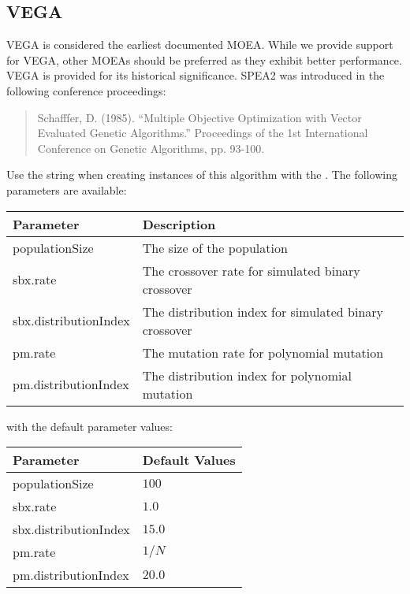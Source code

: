 \subsection{VEGA}
VEGA is considered the earliest documented MOEA.  While we provide support for VEGA, other MOEAs should be preferred as they exhibit better performance.  VEGA is provided for its historical significance. SPEA2 was introduced in the following conference proceedings:
\begin{quote}
Schafffer, D. (1985).  ``Multiple Objective Optimization with Vector Evaluated Genetic Algorithms.''  Proceedings of the 1st International Conference on Genetic Algorithms, pp. 93-100.
\end{quote}
Use the string  when creating instances of this algorithm with the .  The following parameters are available:
\newline
\newline
\begin{tabularx}{\linewidth}{lX}
  \hline
  Parameter & Description \\
  \hline
  populationSize & The size of the population \\
  sbx.rate & The crossover rate for simulated binary crossover \\
  sbx.distributionIndex & The distribution index for simulated binary crossover \\
  pm.rate & The mutation rate for polynomial mutation \\
  pm.distributionIndex & The distribution index for polynomial mutation \\
  \hline
\end{tabularx}
\newline
\newline
with the default parameter values:
\newline
\newline
\begin{tabularx}{\linewidth}{lX}
  \hline
  Parameter & Default Values \\
  \hline
  populationSize & $100$ \\
  sbx.rate & $1.0$ \\
  sbx.distributionIndex & $15.0$ \\
  pm.rate & $1/N$ \\
  pm.distributionIndex & $20.0$ \\
  \hline
\end{tabularx}






